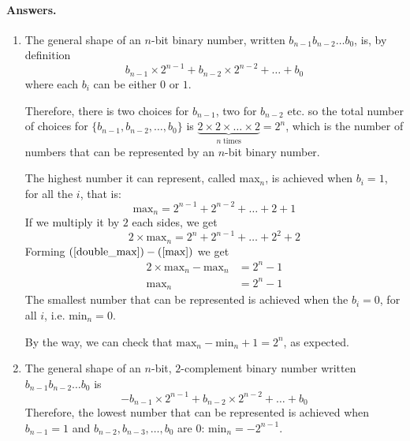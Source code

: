 \paragraph{Answers.}
\begin{enumerate}

  \item The general shape of an \(n\)-bit binary number, written
    \(b_{n-1}b_{n-2}\dots b_{0}\), is, by definition
    \[
    b_{n-1} \times 2^{n-1} + b_{n-2} \times 2^{n-2} + \dots + b_0
    \]
    where each \(b_i\) can be either \(0\) or \(1\).

    Therefore, there is two choices for \(b_{n-1}\), two for
    \(b_{n-2}\) etc. so the total number of choices for \(\{b_{n-1},
    b_{n-2}, \dots, b_0\}\) is \(\underbrace{2 \times 2 \times \dots
      \times 2}_{n \; \text{times}} = 2^n\), which is the number of
    numbers that can be represented by an \(n\)-bit binary number.

    The highest number it can represent, called max\(_n\), is achieved
    when \(b_i = 1\), for all the \(i\), that is:
    \begin{equation}
      \text{max}_{n} = 2^{n-1} + 2^{n-2} + \dots + 2 + 1 \label{max}
    \end{equation}
    If we multiply it by \(2\) each sides, we get
    \begin{equation}
      2 \times \text{max}_{n} = 2^{n} + 2^{n-1} + \dots + 2^{2} + 2
      \label{double_max}
    \end{equation}
    Forming \((\ref{double_max}) - (\ref{max})\) we get
    \begin{align*}
      2 \times \text{max}_n - \text{max}_n &= 2^{n} - 1\\
      \text{max}_n &= 2^{n} - 1
    \end{align*}
    The smallest number that can be represented is achieved when the
    \(b_i = 0\), for all \(i\), i.e. \(\text{min}_{n} = 0\).

    By the way, we can check that \(\text{max}_n - \text{min}_n + 1 =
    2^n\), as expected.

  \item \label{two_complement} The general shape of an \(n\)-bit,
    \(2\)-complement binary number written \(
    b_{n-1}b_{n-2}\dots{b_0}\) is
    \[
     -b_{n-1} \times 2^{n-1} + b_{n-2} \times 2^{n-2} + \dots + b_0
    \]
    Therefore, the lowest number that can be represented is achieved
    when \(b_{n-1}=1\) and \(b_{n-2}, b_{n-3}, \dots, b_0\) are \(0\):
    \(\text{min}_n=-2^{n-1}\).


\end{enumerate}

